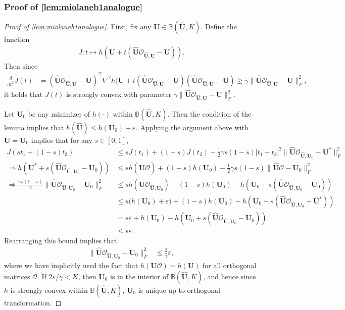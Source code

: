 \documentclass[10pt]{article}
\newcommand{\eps}{\ensuremath{\varepsilon}}
\newcommand{\s}{^*}
\renewcommand{\t}{^{\top}}
\renewcommand{\hat}{\widehat}
\theoremstyle{definition}
\begin{document}
\subsubsection{Proof of \cref{lem:miolaneb1analogue}} \label{sec:miolaneb1analogueproof}
\begin{proof}[Proof of \cref{lem:miolaneb1analogue}]
First, fix any $\bm{U} \in \mathbb{B}(\bm{\hat U},K)$.    Define the function
\begin{align}
    J : t \mapsto h( \bm{U} + t ( \bm{\hat U} \mathcal{O}_{\bm{\hat U},\bm{U}} - \bm{U} ) ).
\end{align}
Then since
\begin{align}
    \frac{d}{dt^2} J(t) &= ( \bm{\hat U} \mathcal{O}_{\bm{\hat U},\bm{U}} - \bm{U} )\t \nabla^2 h(  \bm{U} + t ( \bm{\hat U} \mathcal{O}_{\bm{\hat U},\bm{U}} - \bm{U})( \bm{\hat U} \mathcal{O}_{\bm{\hat U},\bm{U}} - \bm{U} ) \geq \gamma \|  \bm{\hat U} \mathcal{O}_{\bm{\hat U},\bm{U}} - \bm{U}\|_F^2,
\end{align}
it holds that $J(t)$ is strongly convex with parameter $\gamma \| \bm{\hat U} \mathcal{O}_{\bm{\hat U},\bm{U}} - \bm{U} \|_F^2$.

Let $\bm{U}_0$ be any minimizer of $h(\cdot)$ within $\mathbb{B}(\bm{\hat U},K)$. Then the condition of the lemma implies that $h(\bm{\hat U}) \leq h(\bm{U}_0) + \eps$.   Applying the argument above with $\bm{U} = \bm{U}_0$ implies that for any $s \in [0,1]$,
\begin{align}
    J(s t_1 + (1- s) t_2 ) &\leq s J(t_1) + (1- s) J(t_2) - \frac{1}{2} \gamma s(1-s) | t_1 - t_2|^2   \|  \bm{\hat U} \mathcal{O}_{\bm{\hat U},\bm{U}_0} - \bm{U}\s \|_F^2 \\
    \Longrightarrow h( \bm{U}\s + s ( \bm{\hat U} \mathcal{O}_{\bm{\hat U},\bm{U}_0} - \bm{U}_0 )) &\leq s h( \bm{\hat U} \mathcal{O}) + (1-s) h(\bm{U}_0) - \frac{1}{2} \gamma s(1-s)   \|  \bm{\hat U} \mathcal{O} - \bm{U}_0 \|_F^2 \\
    \Longrightarrow \frac{\gamma s(1-s)}{2} \| \bm{\hat U}\mathcal{O}_{\bm{\hat U},\bm{U}_0} - \bm{U}_0 \|_F^2 &\leq s h(\bm{\hat U}\mathcal{O}_{\bm{\hat U},\bm{U}_0}) + (1 - s) h(\bm{U}_0) - h(\bm{U}_0 + s(\bm{\hat U} \mathcal{O}_{\bm{\hat U},\bm{U}_0} - \bm{U}_0 )) \\
    &\leq s \big( h (\bm{U}_0) + \eps \big) + (1-s) h(\bm{U}_0)  - h(\bm{U}_0 + s(\bm{\hat U}\mathcal{O}_{\bm{\hat U},\bm{U}_0} - \bm{U}\s )) \\
    &= s \eps + h(\bm{U}_0) - h(\bm{U}_0+ s (\bm{\hat U}\mathcal{O}_{\bm{\hat U},\bm{U}_0} - \bm{U}_0)) \\
    &\leq s \eps.
\end{align}
Rearranging this bound implies that 
\begin{align}
     \| \bm{\hat U} \mathcal{O}_{\bm{\hat U},\bm{U}_0} - \bm{U}_0 \|_F^2 &\leq \frac{2}{\gamma} \eps,
\end{align}
where we have implicitly used the fact that $h(\bm{U}\mathcal{O}) = h(\bm{U})$ for all orthogonal matrices $\mathcal{O}$.  If $2\eps/\gamma < K$, then $\bm{U}_0$ is in the interior of $\mathbb{B}(\bm{\hat U},K)$, and hence since $h$ is strongly convex within $\mathbb{B}(\bm{\hat U},K)$, $\bm{U}_0$ is unique up to orthogonal transformation. 


\end{proof}
\end{document}
